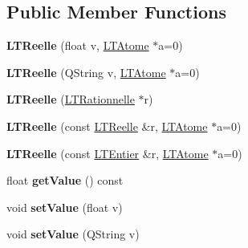 \subsection*{Public Member Functions}
\begin{DoxyCompactItemize}
\item 
{\bfseries L\+T\+Reelle} (float v, \hyperlink{class_l_t_atome}{L\+T\+Atome} $\ast$a=0)\hypertarget{class_l_t_reelle_afb7cdbfe12872e93e79bac2966885e4e}{}\label{class_l_t_reelle_afb7cdbfe12872e93e79bac2966885e4e}

\item 
{\bfseries L\+T\+Reelle} (Q\+String v, \hyperlink{class_l_t_atome}{L\+T\+Atome} $\ast$a=0)\hypertarget{class_l_t_reelle_a470002c809b5589328d5f418e3807bc4}{}\label{class_l_t_reelle_a470002c809b5589328d5f418e3807bc4}

\item 
{\bfseries L\+T\+Reelle} (\hyperlink{class_l_t_rationnelle}{L\+T\+Rationnelle} $\ast$r)\hypertarget{class_l_t_reelle_aa939da3e27c0e5ee34bacd81eff0fa25}{}\label{class_l_t_reelle_aa939da3e27c0e5ee34bacd81eff0fa25}

\item 
{\bfseries L\+T\+Reelle} (const \hyperlink{class_l_t_reelle}{L\+T\+Reelle} \&r, \hyperlink{class_l_t_atome}{L\+T\+Atome} $\ast$a=0)\hypertarget{class_l_t_reelle_a4538afbd0564da09cbdc00a79786ec71}{}\label{class_l_t_reelle_a4538afbd0564da09cbdc00a79786ec71}

\item 
{\bfseries L\+T\+Reelle} (const \hyperlink{class_l_t_entier}{L\+T\+Entier} \&r, \hyperlink{class_l_t_atome}{L\+T\+Atome} $\ast$a=0)\hypertarget{class_l_t_reelle_abd48670d357c40e0a0035f08f8e20a59}{}\label{class_l_t_reelle_abd48670d357c40e0a0035f08f8e20a59}

\item 
float {\bfseries get\+Value} () const \hypertarget{class_l_t_reelle_adeeda9517c7e6194fdcb01f1be859591}{}\label{class_l_t_reelle_adeeda9517c7e6194fdcb01f1be859591}

\item 
void {\bfseries set\+Value} (float v)\hypertarget{class_l_t_reelle_a8ffcb74ee3e21f2389f274f953f7639d}{}\label{class_l_t_reelle_a8ffcb74ee3e21f2389f274f953f7639d}

\item 
void {\bfseries set\+Value} (Q\+String v)\hypertarget{class_l_t_reelle_a8fb7fee3b060e3e32af6f70bf7e11cf2}{}\label{class_l_t_reelle_a8fb7fee3b060e3e32af6f70bf7e11cf2}


\end{DoxyCompactItemize}
